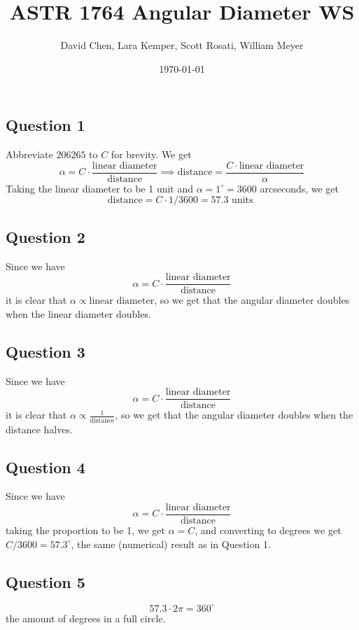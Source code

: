 \documentclass[12pt,letterpaper]{article}
\title{ASTR 1764 Angular Diameter WS}
\author{David Chen, Lara Kemper, Scott Rosati, William Meyer}
\date{\today}
\theoremstyle{definition}
\begin{document}
\maketitle

\subsection*{Question 1}

Abbreviate $206265$ to $C$ for brevity. We get
\[
  \alpha = C \cdot \frac{\text{linear diameter}}{\text{distance}} \implies \text{distance} = \frac{C \cdot \text{linear diameter}}{\alpha}
\]
Taking the linear diameter to be 1 unit and $\alpha = 1^{\circ} = 3600$ arcseconds, we get
\[
  \text{distance} = C \cdot 1 / 3600 = 57.3 \text{ units }
\]

\subsection*{Question 2}

Since we have
\[
  \alpha = C \cdot \frac{\text{linear diameter}}{\text{distance}}
\]
it is clear that $\alpha \propto \text{linear diameter}$, so we get that the angular diameter doubles when the linear diameter doubles.

\subsection*{Question 3}

Since we have
\[
  \alpha = C \cdot \frac{\text{linear diameter}}{\text{distance}}
\]
it is clear that $\alpha \propto \frac{1}{\text{distance}}$, so we get that the angular diameter doubles when the distance halves.

\subsection*{Question 4}

Since we have
\[
  \alpha = C \cdot \frac{\text{linear diameter}}{\text{distance}}
\]
taking the proportion to be 1, we get $\alpha = C$, and converting to degrees we get $C / 3600 = 57.3^{\circ}$, the same (numerical) result as in Question 1.

\subsection*{Question 5}
\[
  57.3 \cdot 2\pi = 360^{\circ}
\]
the amount of degrees in a full circle.
\end{document}
